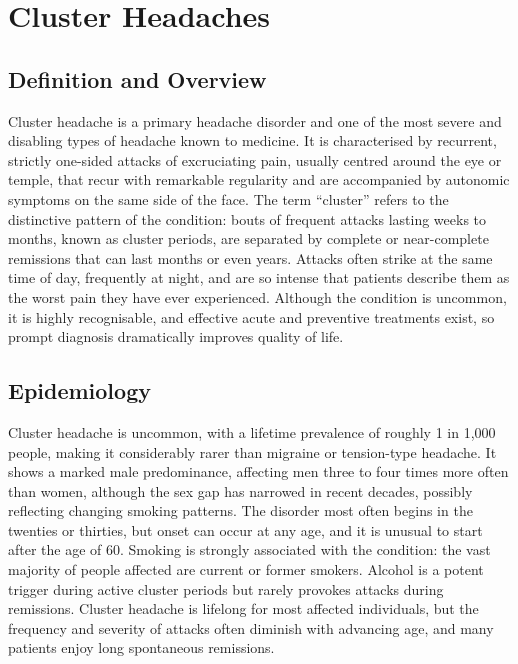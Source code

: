 \chapter{Cluster Headaches}

\section*{Definition and Overview}
Cluster headache is a primary headache disorder and one of the most severe and disabling types of headache known to medicine. It is characterised by recurrent, strictly one-sided attacks of excruciating pain, usually centred around the eye or temple, that recur with remarkable regularity and are accompanied by autonomic symptoms on the same side of the face. The term ``cluster'' refers to the distinctive pattern of the condition: bouts of frequent attacks lasting weeks to months, known as cluster periods, are separated by complete or near-complete remissions that can last months or even years. Attacks often strike at the same time of day, frequently at night, and are so intense that patients describe them as the worst pain they have ever experienced. Although the condition is uncommon, it is highly recognisable, and effective acute and preventive treatments exist, so prompt diagnosis dramatically improves quality of life.

\section*{Epidemiology}
Cluster headache is uncommon, with a lifetime prevalence of roughly 1 in 1,000 people, making it considerably rarer than migraine or tension-type headache. It shows a marked male predominance, affecting men three to four times more often than women, although the sex gap has narrowed in recent decades, possibly reflecting changing smoking patterns. The disorder most often begins in the twenties or thirties, but onset can occur at any age, and it is unusual to start after the age of 60. Smoking is strongly associated with the condition: the vast majority of people affected are current or former smokers. Alcohol is a potent trigger during active cluster periods but rarely provokes attacks during remissions. Cluster headache is lifelong for most affected individuals, but the frequency and severity of attacks often diminish with advancing age, and many patients enjoy long spontaneous remissions.


